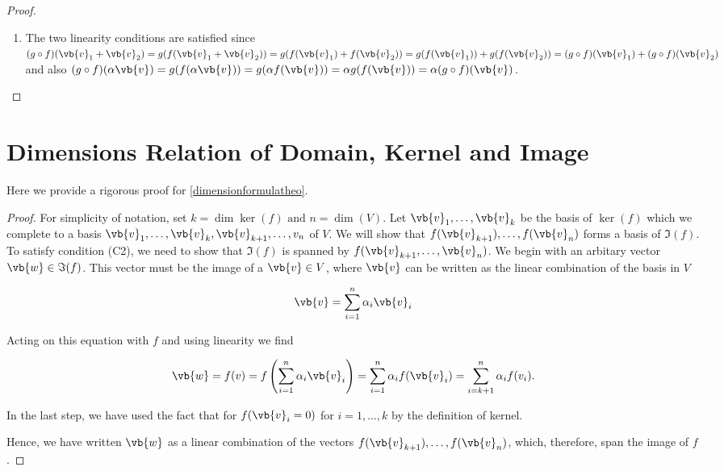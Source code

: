 \documentclass[a4paper,12pt]{report}
\begin{document}
\begin{appendices}
\begin{proof}
\begin{enumerate}[label=(\(F\)\arabic*)]
    \item The two linearity conditions are satisfied since \((g \circ f)(\vb{v} _{1} + \vb{v} _{2}  ) = g(f(\vb{v} _{1} + \vb{v} _{2}  )) = g(f(\vb{v} _{1} )+ f(\vb{v} _{2} )) = g(f(\vb{v} _{1} )) + g(f(\vb{v} _{2} )) = (g \circ f)(\vb{v} _{1} ) + (g \circ f) (\vb{v} _{2} )\) and also \((g \circ f)(\alpha \vb{v} ) = g(f(\alpha \vb{v} )) = g(\alpha f(\vb{v} )) = \alpha g(f(\vb{v} )) = \alpha (g \circ f) (\vb{v} )\).     
\end{enumerate}
\end{proof}
    
\section{Dimensions Relation of Domain, Kernel and Image} \label{dimensionformulaapp} 

Here we provide a rigorous proof for \cref{dimensionformulatheo}.

\begin{proof}
For simplicity of notation, set \(k = \dim \ker (f) \text { and } n=\dim (V)\). Let \(\vb{v}_{1}, \ldots, \vb{v}_k \) be the basis of \(\ker (f)\) which we complete to a basis \(\vb{v}_{1}, \ldots, \vb{v}_k, \vb{v} _{k+1}, \ldots ,v_{n}  \) of \(V\). We will show that \(f(\vb{v} _{k+1} ), \ldots , f(\vb{v} _{n} )\) forms a basis of \(\Im (f)\). To satisfy condition (C2), we need to show that \(\Im (f)\) is spanned by \(f(\vb{v} _{k+1}, \ldots , \vb{v} _{n}  )\). We begin with an arbitary vector \(\vb{w} \in \Im (f)\). This vector must be the image of a \(\vb{v} \in  V\), where \(\vb{v} \) can be written as the linear combination of the basis in \(V\) 
    
\begin{equation}
    \vb{v} = \sum_{i=1}^{n} \alpha _{i} \vb{v} _{i}  
\end{equation}
    
Acting on this equation with \(f\) and using linearity we find
    
\begin{equation}
    \vb{w} = f(v) = f \left( \sum_{i=1}^{n} \alpha _{i} \vb{v} _{i}  \right) = \sum_{i=1}^{n} \alpha _{i} f(\vb{v} _{i} ) = \sum_{i=k+1}^{n} \alpha _{i} f(v_{i} ).  
\end{equation}
    
In the last step, we have used the fact that for \(f(\vb{v} _{i} = 0 )\) for \(i = 1,\ldots , k\) by the definition of kernel.
    
Hence, we have written \(\vb{w}\) as a linear combination of the vectors \(f(\vb{v} _{k+1} ), \ldots , f(\vb{v} _{n} )\), which, therefore, span the image of \(f\).
    

\end{proof}
\end{appendices}
\end{document}

